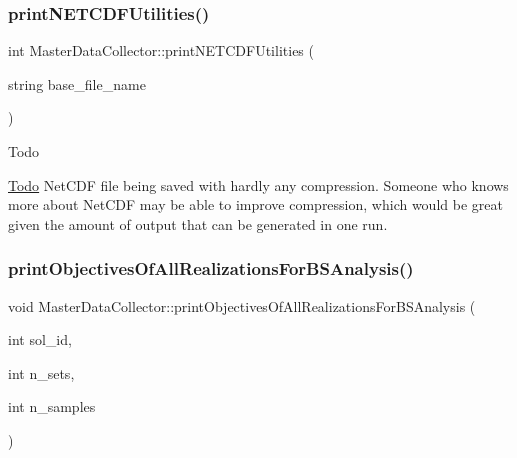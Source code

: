 \mbox{\label{classMasterDataCollector_afabd59af08d3ee5dec1a6710a1966e8e_afabd59af08d3ee5dec1a6710a1966e8e}} 
\subsubsection{\texorpdfstring{print\+N\+E\+T\+C\+D\+F\+Utilities()}{printNETCDFUtilities()}}
{\footnotesize\ttfamily int Master\+Data\+Collector\+::print\+N\+E\+T\+C\+D\+F\+Utilities (\begin{DoxyParamCaption}\item[{string}]{base\+\_\+file\+\_\+name }\end{DoxyParamCaption})}

\begin{DoxyRefDesc}{Todo}
\item[\mbox{\hyperlink{todo__todo000001}{Todo}}]Net\+C\+DF file being saved with hardly any compression. Someone who knows more about Net\+C\+DF may be able to improve compression, which would be great given the amount of output that can be generated in one run. \end{DoxyRefDesc}
\mbox{\label{classMasterDataCollector_a03f0a7bdc1502cbe23905dbfc48e6546_a03f0a7bdc1502cbe23905dbfc48e6546}} 
\subsubsection{\texorpdfstring{print\+Objectives\+Of\+All\+Realizations\+For\+B\+S\+Analysis()}{printObjectivesOfAllRealizationsForBSAnalysis()}}
{\footnotesize\ttfamily void Master\+Data\+Collector\+::print\+Objectives\+Of\+All\+Realizations\+For\+B\+S\+Analysis (\begin{DoxyParamCaption}\item[{int}]{sol\+\_\+id,  }\item[{int}]{n\+\_\+sets,  }\item[{int}]{n\+\_\+samples }\end{DoxyParamCaption})}


